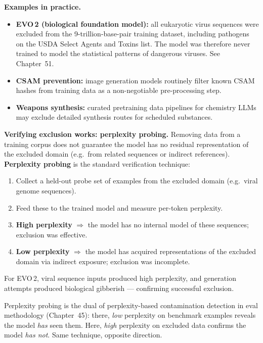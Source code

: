 \textbf{Examples in practice.}
\begin{itemize}
  \item \textbf{EVO\,2 (biological foundation model):} all eukaryotic virus sequences
    were excluded from the 9-trillion-base-pair training dataset, including pathogens
    on the USDA Select Agents and Toxins list. The model was therefore never trained
    to model the statistical patterns of dangerous viruses. See Chapter~51.
  \item \textbf{CSAM prevention:} image generation models routinely filter known CSAM
    hashes from training data as a non-negotiable pre-processing step.
  \item \textbf{Weapons synthesis:} curated pretraining data pipelines for chemistry
    LLMs may exclude detailed synthesis routes for scheduled substances.
\end{itemize}

\textbf{Verifying exclusion works: perplexity probing.}
Removing data from a training corpus does not guarantee the model has no residual
representation of the excluded domain (e.g.\ from related sequences or indirect
references). \textbf{Perplexity probing} is the standard verification technique:

\begin{enumerate}
  \item Collect a held-out probe set of examples from the excluded domain (e.g.\ viral
    genome sequences).
  \item Feed these to the trained model and measure per-token perplexity.
  \item \textbf{High perplexity} $\Rightarrow$ the model has no internal model of these
    sequences; exclusion was effective.
  \item \textbf{Low perplexity} $\Rightarrow$ the model has acquired representations of
    the excluded domain via indirect exposure; exclusion was incomplete.
\end{enumerate}

For EVO\,2, viral sequence inputs produced high perplexity, and generation attempts
produced biological gibberish --- confirming successful exclusion.

\begin{notebox}
  Perplexity probing is the dual of perplexity-based contamination detection in eval
  methodology (Chapter~45): there, \emph{low} perplexity on benchmark examples reveals
  the model \emph{has} seen them. Here, \emph{high} perplexity on excluded data
  confirms the model \emph{has not}. Same technique, opposite direction.
\end{notebox}

